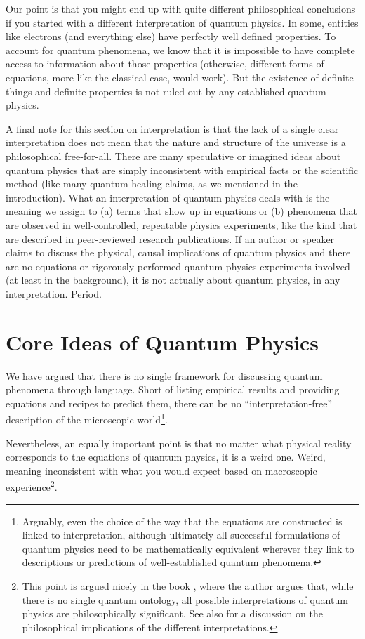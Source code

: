 \documentclass[12pt,onecolumn,preprintnumbers,amsmath,amssymbn,reprint,nofootinbib,superscriptaddress]{revtex4}    %
\begin{document}
Our point is that you might end up with quite different philosophical conclusions if you started with a different interpretation of quantum physics.  In some, entities like electrons (and everything else) have perfectly well defined properties.  To account for quantum phenomena, we know that it is impossible to have complete access to information about those properties (otherwise, different forms of equations, more like the classical case, would work).  But the existence of definite things and definite properties is not ruled out by any established quantum physics.

A final note for this section on interpretation is that the lack of a single clear interpretation does not mean that the nature and structure of the universe is a philosophical free-for-all.  There are many speculative or imagined ideas about quantum physics that are simply inconsistent with empirical facts or the scientific method (like many quantum healing claims, as we mentioned in the introduction).  What an interpretation of quantum physics deals with is the meaning we assign to (a) terms that show up in equations or (b) phenomena that are observed in well-controlled, repeatable physics experiments, like the kind that are described in peer-reviewed research publications. If an author or speaker claims to discuss the physical, causal implications of quantum physics and there are no equations or rigorously-performed quantum physics experiments involved (at least in the background), it is not actually about quantum physics, in any interpretation.  Period.

\section{Core Ideas of Quantum Physics}

We have argued that there is no single framework for discussing quantum phenomena through language.  Short of listing empirical results and providing equations and recipes to predict them, there can be no ``interpretation-free'' description of the microscopic world\footnote{Arguably, even the choice of the way that the equations are constructed is linked to interpretation, although ultimately all successful formulations of quantum physics need to be mathematically equivalent wherever they link to descriptions or predictions of well-established quantum phenomena.}.

Nevertheless, an equally important point is that no matter what physical reality corresponds to the equations of quantum physics, it is a weird one.  Weird, meaning inconsistent with what you would expect based on macroscopic experience\footnote{This point is argued nicely in the book \cite{ontology}, where the author argues that, while there is no single quantum ontology, all possible interpretations of quantum physics are philosophically significant. See also \cite{Pessoa} for a discussion on the philosophical implications of the different interpretations.}.
\end{document}
